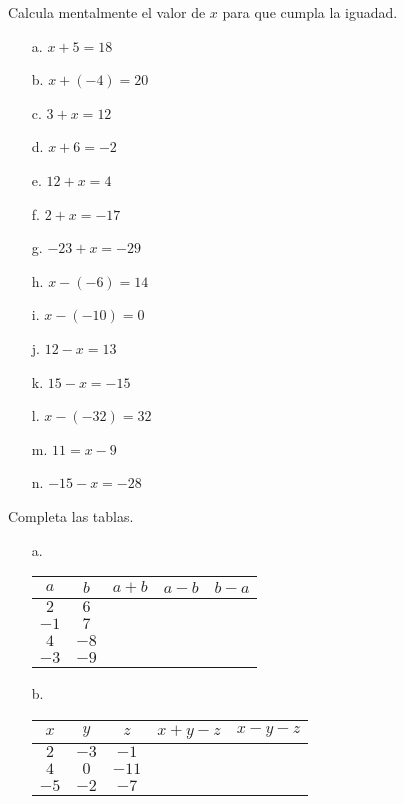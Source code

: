 \documentclass[spanish,letterpaper, 11pt, addpoints, answers]{exam}
\begin{document}
\begin{questions}
\begin{multicols}{2}
\end{multicols}

\question Calcula mentalmente el valor de $x$ para que cumpla la iguadad.

\begin{multicols}{2}

\begin{itemize}
  \item[a.] $x+5=18$
  \item[b.] $x+(-4)=20$
  \item[c.] $3+x=12$
  \item[d.] $x+6=-2$
  \item[e.] $12+x=4$
  \item[f.] $2+x=-17$
  \item[g.] $-23+x=-29$
  \item[h.] $x-(-6)=14$
  \item[i.] $x-(-10)=0$
  \item[j.] $12-x=13$
  \item[k.] $15-x=-15$
  \item[l.] $x-(-32)=32$
  \item[m.] $11=x-9$
  \item[n.] $-15-x=-28$
         
\end{itemize}

\end{multicols}

\question Completa las tablas.

\begin{itemize}
  \item[a.]
\begin{center}
  \begin{tabular}{|c|c|>{\centering\arraybackslash}p{2.5cm}|>{\centering\arraybackslash}p{2.5cm}|>{\centering\arraybackslash}p{2.5cm}|}\hline
    $a$ & $b$ & $a+b$ & $a-b$ & $b-a$ \\ \hline
    $2$ & $6$ &&& \\ \hline
    $-1$ & $7$ &&& \\ \hline
    $4$ & $-8$ &&& \\ \hline
    $-3$ & $-9$ &&& \\ \hline
  \end{tabular}
\end{center}
\vspace{0.5cm}
\item[b.]
\begin{center}
  \begin{tabular}{|c|c|c|>{\centering\arraybackslash}p{3.5cm}|>{\centering\arraybackslash}p{3.5cm}|}\hline
  $x$&$y$&$z$&$x+y-z$&$x-y-z$\\ \hline
  $2$&$-3$&$-1$&&\\ \hline
  $4$&$0$&$-11$&&\\ \hline
  $-5$&$-2$&$-7$&&\\ \hline
  

\end{tabular}
\end{center}
\end{itemize}
\end{questions}
\end{document}
